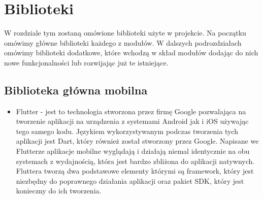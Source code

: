\documentclass[a4paper,twoside,12pt]{book}
\begin{document}
\section{Biblioteki}
W rozdziale tym zostaną omówione biblioteki użyte w projekcie. Na początku omówimy główne biblioteki każdego z modułów. W dalszych podrozdziałach omówimy biblioteki dodatkowe, które wchodzą w skład modułów dodając do nich nowe funkcjonalności lub rozwijając już te istniejące.
\subsection{Biblioteka główna mobilna}
\begin{itemize}
    \item Flutter - jest to technologia stworzona przez firmę Google pozwalająca na tworzenie aplikacji na urządzenia z systemami Android jak i iOS używając tego samego kodu. Językiem wykorzystywanym podczas tworzenia tych aplikacji jest Dart, który również został stworzony przez Google. Napisane we Flutterze aplikacje mobilne wyglądają i działają niemal identycznie na obu systemach z wydajnością, która jest bardzo zbliżona do aplikacji natywnych. Fluttera tworzą dwa podstawowe elementy którymi są framework, który jest niezbędny do poprawnego działania aplikacji oraz pakiet SDK, który jest konieczny do ich tworzenia.
\end{itemize}
\end{document}

